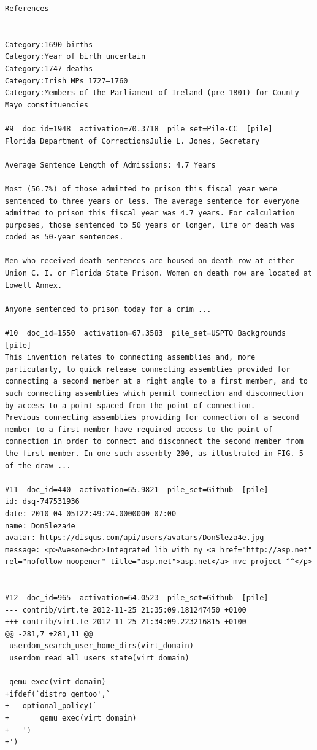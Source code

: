 \begin{verbatim}
References 
 

Category:1690 births
Category:Year of birth uncertain
Category:1747 deaths
Category:Irish MPs 1727–1760
Category:Members of the Parliament of Ireland (pre-1801) for County Mayo constituencies

#9  doc_id=1948  activation=70.3718  pile_set=Pile-CC  [pile]
Florida Department of CorrectionsJulie L. Jones, Secretary

Average Sentence Length of Admissions: 4.7 Years

Most (56.7%) of those admitted to prison this fiscal year were sentenced to three years or less. The average sentence for everyone admitted to prison this fiscal year was 4.7 years. For calculation purposes, those sentenced to 50 years or longer, life or death was coded as 50-year sentences.

Men who received death sentences are housed on death row at either Union C. I. or Florida State Prison. Women on death row are located at Lowell Annex.

Anyone sentenced to prison today for a crim ...

#10  doc_id=1550  activation=67.3583  pile_set=USPTO Backgrounds  [pile]
This invention relates to connecting assemblies and, more particularly, to quick release connecting assemblies provided for connecting a second member at a right angle to a first member, and to such connecting assemblies which permit connection and disconnection by access to a point spaced from the point of connection.
Previous connecting assemblies providing for connection of a second member to a first member have required access to the point of connection in order to connect and disconnect the second member from the first member. In one such assembly 200, as illustrated in FIG. 5 of the draw ...

#11  doc_id=440  activation=65.9821  pile_set=Github  [pile]
id: dsq-747531936
date: 2010-04-05T22:49:24.0000000-07:00
name: DonSleza4e
avatar: https://disqus.com/api/users/avatars/DonSleza4e.jpg
message: <p>Awesome<br>Integrated lib with my <a href="http://asp.net" rel="nofollow noopener" title="asp.net">asp.net</a> mvc project ^^</p>


#12  doc_id=965  activation=64.0523  pile_set=Github  [pile]
--- contrib/virt.te	2012-11-25 21:35:09.181247450 +0100
+++ contrib/virt.te	2012-11-25 21:34:09.223216815 +0100
@@ -281,7 +281,11 @@
 userdom_search_user_home_dirs(virt_domain)
 userdom_read_all_users_state(virt_domain)
 
-qemu_exec(virt_domain)
+ifdef(`distro_gentoo',`
+	optional_policy(`
+		qemu_exec(virt_domain)
+	')
+')
 

\end{verbatim}
